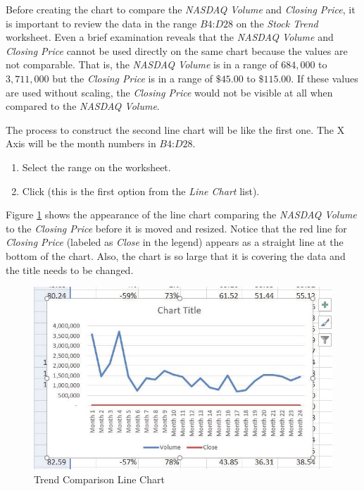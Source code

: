 Before creating the chart to compare the \textit{NASDAQ Volume} and \textit{Closing Price}, it is important to review the data in the range $ B4 $:$ D28 $ on the \textit{Stock Trend} worksheet. Even a brief examination reveals that the \textit{NASDAQ Volume} and \textit{Closing Price} cannot be used directly on the same chart because the values are not comparable. That is, the \textit{NASDAQ Volume} is in a range of $ 684,000 $ to $ 3,711,000 $ but the \textit{Closing Price} is in a range of $ \$45.00 $ to $ \$115.00 $. If these values are used without scaling, the \textit{Closing Price} would not be visible at all when compared to the \textit{NASDAQ Volume}.

The process to construct the second line chart will be like the first one. The X Axis will be the month numbers in $ B4 $:$ D28 $.

\begin{enumerate}
	\item Select the range  on the  worksheet.
	\item Click  (this is the first option from the \textit{Line Chart} list).
\end{enumerate}

Figure \ref{04:fig07} shows the appearance of the line chart comparing the \textit{NASDAQ Volume} to the \textit{Closing Price} before it is moved and resized. Notice that the red line for \textit{Closing Price} (labeled as \textit{Close} in the legend) appears as a straight line at the bottom of the chart. Also, the chart is so large that it is covering the data and the title needs to be changed.

\begin{figure}[H]
	\centering
	\includegraphics[width=\maxwidth{.95\linewidth}]{gfx/ch04_fig07}
	\caption{Trend Comparison Line Chart}
	\label{04:fig07}
\end{figure}

